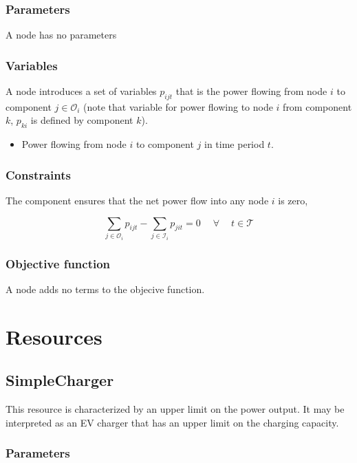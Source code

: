 \documentclass[]{report}
\newcommand{\timesteps}{\mathcal{T}}
\newcommand{\outputs}{\mathcal{O}}
\newcommand{\inputs}{\mathcal{I}}
\let\oldforall\forall
\renewcommand{\forall}{\; \oldforall \: }
\begin{document}
\subsubsection*{Parameters}
A node has no parameters
\subsubsection*{Variables}
A node introduces a set of variables $p_{ijt}$ that is the power flowing from node $i$ to component $j \in \outputs_i$ (note that variable for power flowing to node $i$ from component $k$, $p_{ki}$ is defined by component $k$). 

\begin{itemize}
    \item [$p_{ijt}$] Power flowing from node $i$ to component $j$ in time period $t$.
\end{itemize}

\subsubsection*{Constraints}
The component ensures that the net power flow into any node $i$ is zero,

\begin{equation}
    \sum_{j \in \outputs_i} p_{ijt} - \sum_{j \in \inputs_i} p_{jit} = 0 \quad \forall \quad t \in \timesteps
\end{equation}

\subsubsection*{Objective function}
A node adds no terms to the objecive function.

\newpage
\section{Resources}
\label{sect:resources}

\subsection{SimpleCharger}
This resource is characterized by an upper limit on the power output. It may be interpreted as an EV charger that has an upper limit on the charging capacity.%

\subsubsection*{Parameters}
\end{document}
